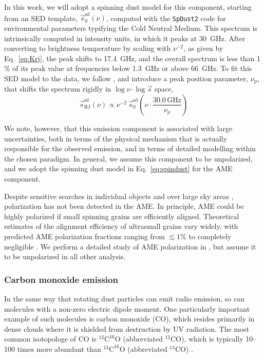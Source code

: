 \documentclass[onecolumn]{aa}
\newcommand{\s}[0]{\vec{s}}
\begin{document}
In this work, we will adopt a spinning dust model for this component,
starting from an SED template, $\s^{\mathrm{sd}}_0(\nu)$, computed
with the \texttt{SpDust2} code \citep{ali-haimoud:2009,
  ali-haimoud:2010, silsbee:2011} for environmental parameters typifying
the Cold Neutral Medium. This
spectrum is intrinsically computed in intensity units, in which it
peaks at 30~GHz. After converting to brightness temperature by scaling
with $\nu^{-2}$, as given by Eq.~\eqref{eq:Krj}, the peak shifts to
17.4~GHz, and the overall spectrum is less than 1\,\% of its peak
value at frequencies below 1.3~GHz or above 66~GHz. To fit this SED
model to the data, we follow \citet{bennett2012}, and introduce a peak
position parameter, $\nu_{\mathrm{p}}$, that shifts the spectrum
rigidly in $\log\nu$--$\log\s$ space,
\begin{equation}
\s^{\mathrm{sd}}_{\mathrm{RJ}}(\nu) \propto
\nu^{-2}\,\s^{\mathrm{sd}}_0\left(\nu \cdot
\frac{30.0\,\mathrm{GHz}}{\nu_p}\right)
\label{eq:spindust}
\end{equation}

We note, however, that this emission component is associated with
large uncertainties, both in terms of the physical mechanism that is
actually responsible for the observed emission, and in terms of
detailed modelling within the chosen paradigm. In general, we assume
this component to be unpolarized, and we adopt the spinning dust model
in Eq.~\eqref{eq:spindust} for the AME component.

Despite sensitive searches in individual objects \citep{QUIJOTE_I_2015, QUIJOTE_II_2016}
and over large sky areas \citep{macellari2011},
polarization has not been detected in the AME. In principle, AME could be highly polarized if
small spinning grains are efficiently aligned. Theoretical estimates of the alignment efficiency
of ultrasmall grains vary widely, with predicted AME polarization fractions ranging 
from $\lesssim 1\%$ \citep{hoang2013} to 
completely negligible \citep{draine2016}. We perform a detailed study of AME
polarization in \citet{bp15}, but assume it to be unpolarized in all other analysis.

\subsubsection{Carbon monoxide emission}
\label{sec:co}

In the same way that rotating dust particles can emit radio emission,
so can molecules with a non-zero electric dipole moment. One
particularly important example of such molecules is carbon monoxide
(CO), which resides primarily in dense clouds where it is shielded from
destruction by UV radiation. The most common isotopologe of CO is
$^{12}\mathrm{C}^{16}\mathrm{O}$ (abbreviated $^{12}\mathrm{CO}$),
which is typically 10--100 times more abundant than
$^{13}\mathrm{C}^{16}\mathrm{O}$ (abbreviated $^{13}\mathrm{CO}$)
\citep{szucs:2014}.
\end{document}
